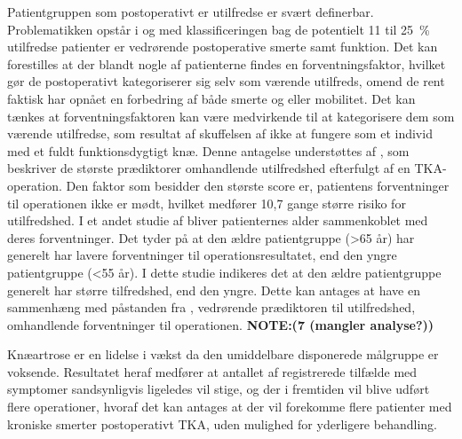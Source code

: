 Patientgruppen som postoperativt er utilfredse er svært definerbar. Problematikken opstår i og med klassificeringen bag de potentielt 11 til 25~\% utilfredse patienter er vedrørende postoperative smerte samt funktion. Det kan forestilles at der blandt nogle af patienterne findes en forventningsfaktor, hvilket gør de postoperativt kategoriserer sig selv som værende utilfreds, omend de rent faktisk har opnået en forbedring af både smerte og eller mobilitet. Det kan tænkes at forventningsfaktoren kan være medvirkende til at kategorisere dem som værende utilfredse, som resultat af skuffelsen af ikke at fungere som et individ med et fuldt funktionsdygtigt knæ. Denne antagelse understøttes af \cite{Bourne2010}, som beskriver de største prædiktorer omhandlende utilfredshed efterfulgt af en TKA-operation. Den faktor som besidder den største score er, patientens forventninger til operationen ikke er mødt, hvilket medfører 10,7 gange større risiko for utilfredshed. \citep{Bourne2010} I et andet studie af \cite{Keudell2013} bliver patienternes alder sammenkoblet med deres forventninger. Det tyder på at den ældre patientgruppe (>65 år) har generelt har lavere forventninger til operationsresultatet, end den yngre patientgruppe (<55 år). I dette studie indikeres det at den ældre patientgruppe generelt har større tilfredshed, end den yngre. Dette kan antages at have en sammenhæng med påstanden fra \cite{Bourne2010}, vedrørende prædiktoren til utilfredshed, omhandlende forventninger til operationen. \textbf{NOTE:(7 (mangler analyse?))}

Knæartrose er en lidelse i vækst da den umiddelbare disponerede målgruppe er voksende. Resultatet heraf medfører at antallet af registrerede tilfælde med symptomer sandsynligvis ligeledes vil stige, og der i fremtiden vil blive udført flere operationer, hvoraf det kan antages at der vil forekomme flere patienter med kroniske smerter postoperativt TKA, uden mulighed for yderligere behandling.

